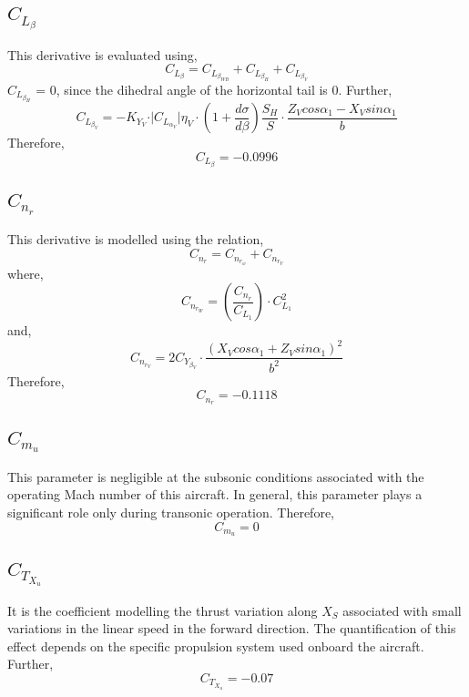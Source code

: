 \documentclass[letterpaper,12pt]{article}
\begin{document}
\subsection{$C_{L_\beta}$}
This derivative is evaluated using,
\begin{equation*}
C_{L_\beta} = C_{L_{\beta_{WB}}} + C_{L_{\beta_H}} + C_{L_{\beta_V}}
\end{equation*}
$C_{L_{\beta_H}}$ = 0, since the dihedral angle of the horizontal tail is 0. Further,
\begin{equation*}
C_{L_{\beta_V}} = -K_{Y_V} \cdot \vert C_{L_{\alpha_V}}\vert \eta_V \cdot \left(1+ \frac{d\sigma}{d\beta}\right) \frac{S_H}{S}\cdot\frac{Z_V cos\alpha_1 - X_V sin\alpha_1}{b}
\end{equation*}
Therefore,
\begin{equation*}
C_{L_\beta} = -0.0996
\end{equation*}
\subsection{$C_{n_r}$}
This derivative is modelled using the relation,
\begin{equation*}
C_{n_r} = C_{n_{r_w}} + C_{n_{r_V}}
\end{equation*}
where,
\begin{equation*}
C_{n_{r_W}} = \left(\frac{C_{n_r}}{C_{L_1}}\right)\cdot C_{L_1}^2
\end{equation*}
and,
\begin{equation*}
C_{n_{r_V}} = 2 C_{Y_{\beta_V}}\cdot\frac{(X_V cos\alpha_1 + Z_V sin\alpha_1)^2}{b^2}
\end{equation*}
Therefore,
\begin{equation*}
C_{n_r} = -0.1118
\end{equation*}
\subsection{$C_{m_u}$}
This parameter is negligible at the subsonic conditions associated with the operating Mach number of this aircraft. In general, this parameter plays a significant role only during transonic operation. Therefore,
\begin{equation*}
C_{m_u} = 0
\end{equation*}
\subsection{$C_{T_{X_u}}$}
It is the coefficient modelling the thrust variation along $X_S$ associated with small variations in the linear speed in the forward direction. The quantification of this effect depends on the specific propulsion system used onboard the aircraft. Further,
\begin{equation*}
C_{T_{X_u}} = -0.07
\end{equation*}
\end{document}
